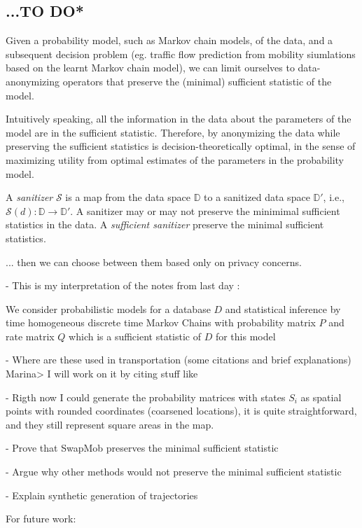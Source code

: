 \documentclass{llncs}
\begin{document}
\subsection{...TO DO*}

Given a probability model, such as Markov chain models, of the data, and a subsequent decision problem (eg. traffic flow prediction from mobility siumlations based on the learnt Markov chain model), we can limit ourselves to data-anonymizing operators that preserve the (minimal) sufficient statistic of the model.

Intuitively speaking, all the information in the data about the parameters of the model are in the sufficient statistic.
Therefore, by anonymizing the data while preserving the sufficient statistics is decision-theoretically optimal, in the sense of maximizing utility from optimal estimates of the parameters in the probability model. 

A {\em sanitizer} $\mathcal{S}$ is a map from the data space $\mathbb{D}$ to a sanitized data space $\mathbb{D}'$, i.e., $\mathcal{S}(d): \mathbb{D} \to \mathbb{D}'$. 
A sanitizer may or may not preserve the minimimal sufficient statistics in the data. 
A {\em sufficient sanitizer} preserve the minimal sufficient statistics.

... then we can choose between them based only on privacy concerns.


- This is my interpretation of the notes from last day :

We consider probabilistic models for a database $D$ and statistical inference by time homogeneous discrete time Markov Chains with probability matrix $P$ and rate matrix $Q$ which is a sufficient statistic of $D$ for this model 

- Where are these used in transportation (some citations and brief explanations) 
Marina> I will work on it by citing stuff like \cite{Cascetta1988}


- Rigth now I could generate the probability matrices with states $S_i$ as spatial points with rounded coordinates (coarsened locations), it is quite straightforward, and they still represent square areas in the map.

- Prove that SwapMob preserves the minimal sufficient statistic

- Argue why other methods would not preserve the minimal sufficient statistic 

- Explain synthetic generation of trajectories 

For future work:
\end{document}
